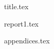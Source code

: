 \documentclass[final]{scrartcl} %
\begin{document}

{title.tex}

\newpage

\tableofcontents

\newpage
{}
{report1.tex}
\newpage
{}

\printbibliography
{appendices.tex}
\end{document}
